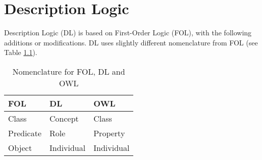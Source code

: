 
\chapter{Description Logic} %

\label{AppendixA} %


Description Logic (DL) is based on First-Order Logic (FOL), with the following additions or modifications. DL uses slightly different nomenclature from FOL (see Table \ref{tab:nomenclature}).

\begin{table}
\centering
\begin{tabular}{|l|l|l|}
\hline
FOL & DL & OWL \\ \hline
Class & Concept & Class \\ \hline
Predicate & Role & Property \\ \hline
Object & Individual & Individual \\ \hline
\end{tabular}
\caption{Nomenclature for FOL, DL and OWL}
\label{tab:nomenclature}
\end{table}

